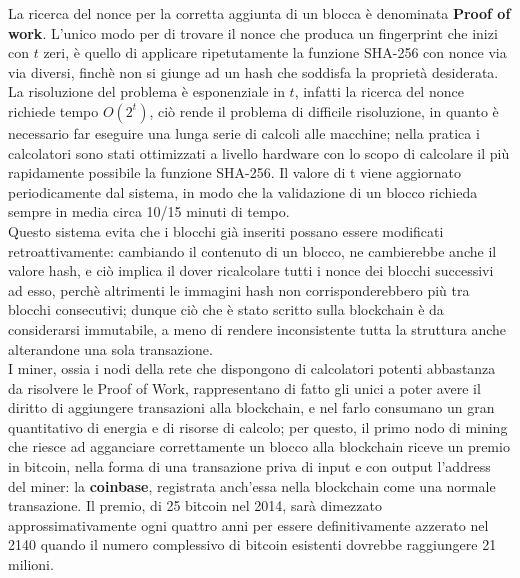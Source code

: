 La ricerca del nonce per la corretta aggiunta di un blocca è denominata \textbf{Proof of work}. L'unico modo per di trovare il nonce che produca un fingerprint che inizi con $t$ zeri, è quello di applicare ripetutamente la funzione SHA-256 con nonce via via diversi, finchè non si giunge ad un hash che soddisfa la proprietà desiderata. La risoluzione del problema è esponenziale in $t$, infatti la ricerca del nonce richiede tempo $O(2^t)$, ciò rende il problema di difficile risoluzione, in quanto è necessario far eseguire una lunga serie di calcoli alle macchine; nella pratica i calcolatori sono stati ottimizzati a livello hardware con lo scopo di calcolare il più rapidamente possibile la funzione SHA-256. Il valore di t viene aggiornato periodicamente dal sistema, in modo che la validazione di un blocco richieda sempre in media circa 10/15 minuti di tempo.\\Questo sistema evita che i blocchi già inseriti possano essere modificati retroattivamente: cambiando il contenuto di un blocco, ne cambierebbe anche il valore hash, e ciò implica il dover ricalcolare tutti i nonce dei blocchi successivi ad esso, perchè altrimenti le immagini hash non corrisponderebbero più tra blocchi consecutivi; dunque ciò che è stato scritto sulla blockchain è da considerarsi immutabile, a meno di rendere inconsistente tutta la struttura anche alterandone una sola transazione.\\I miner, ossia i nodi della rete che dispongono di calcolatori potenti abbastanza da risolvere le Proof of Work, rappresentano di fatto gli unici a poter avere il diritto di aggiungere transazioni alla blockchain, e nel farlo consumano un gran quantitativo di energia e di risorse di calcolo; per questo, il primo nodo di mining che riesce ad agganciare correttamente un blocco alla blockchain riceve un premio in bitcoin, nella forma di una transazione priva di input e con output l’address del miner: la \textbf{coinbase}, registrata anch’essa nella blockchain come una normale transazione. Il premio, di 25 bitcoin nel 2014, sarà dimezzato approssimativamente ogni quattro anni per essere deﬁnitivamente azzerato nel 2140 quando il numero complessivo di bitcoin esistenti dovrebbe raggiungere 21 milioni.
